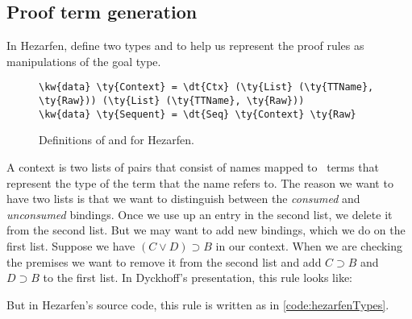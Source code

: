 \subsection{Proof term generation}

In Hezarfen, define two types  and  to help us
represent the proof rules as manipulations of the goal type.

\begin{figure}[ht]
\caption{Definitions of  and  for Hezarfen.}
\label{code:hezarfenTypes}
\begin{Verbatim}[framesep=2mm, label=\footnotesize{\normalfont{Idris}}, labelposition=topline]
\kw{data} \ty{Context} = \dt{Ctx} (\ty{List} (\ty{TTName}, \ty{Raw})) (\ty{List} (\ty{TTName}, \ty{Raw}))
\kw{data} \ty{Sequent} = \dt{Seq} \ty{Context} \ty{Raw}
\end{Verbatim}
\end{figure}

A context is two lists of pairs that consist of names mapped to \Raw\ terms
that represent the type of the term that the name refers to.
The reason we want to have two lists is that we want to distinguish between the
\emph{consumed} and \emph{unconsumed} bindings. Once we use up an entry in the second list,
we delete it from the second list. But we may want to add new bindings, which
we do on the first list. Suppose we have $(C \vee D) \supset B$ in our context.
When we are checking the premises we want to remove it from the second list
and add $C \supset B$ and $D \supset B$ to the first list. In Dyckhoff's
presentation, this rule looks like:

\begin{prooftree}
\end{prooftree}
\vspace{\baselineskip}

But in Hezarfen's source code, this rule is written as in \autoref{code:hezarfenTypes}.

